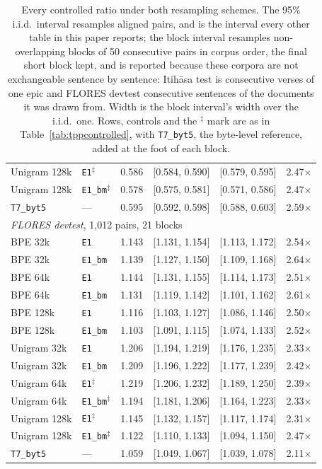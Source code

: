 \begin{table}[t]
\begin{tabular}{llrrrr}
Unigram 128k & \texttt{E1}$^{\ddagger}$ & 0.586 & [0.584, 0.590] & [0.579, 0.595] & 2.47$\times$ \\
Unigram 128k & \texttt{E1\_bm}$^{\ddagger}$ & 0.578 & [0.575, 0.581] & [0.571, 0.586] & 2.47$\times$ \\
\texttt{T7\_byt5} & --- & 0.595 & [0.592, 0.598] & [0.588, 0.603] & 2.59$\times$ \\
\midrule
\multicolumn{6}{l}{\emph{FLORES devtest}, 1,012 pairs, 21 blocks} \\
BPE 32k & \texttt{E1} & 1.143 & [1.131, 1.154] & [1.113, 1.172] & 2.54$\times$ \\
BPE 32k & \texttt{E1\_bm} & 1.139 & [1.127, 1.150] & [1.109, 1.168] & 2.64$\times$ \\
BPE 64k & \texttt{E1} & 1.144 & [1.131, 1.155] & [1.114, 1.173] & 2.51$\times$ \\
BPE 64k & \texttt{E1\_bm} & 1.131 & [1.119, 1.142] & [1.101, 1.162] & 2.61$\times$ \\
BPE 128k & \texttt{E1} & 1.116 & [1.103, 1.127] & [1.086, 1.146] & 2.50$\times$ \\
BPE 128k & \texttt{E1\_bm} & 1.103 & [1.091, 1.115] & [1.074, 1.133] & 2.52$\times$ \\
Unigram 32k & \texttt{E1} & 1.206 & [1.194, 1.219] & [1.176, 1.235] & 2.33$\times$ \\
Unigram 32k & \texttt{E1\_bm} & 1.209 & [1.196, 1.222] & [1.177, 1.239] & 2.42$\times$ \\
Unigram 64k & \texttt{E1}$^{\ddagger}$ & 1.219 & [1.206, 1.232] & [1.189, 1.250] & 2.39$\times$ \\
Unigram 64k & \texttt{E1\_bm}$^{\ddagger}$ & 1.194 & [1.181, 1.206] & [1.164, 1.223] & 2.33$\times$ \\
Unigram 128k & \texttt{E1}$^{\ddagger}$ & 1.145 & [1.132, 1.157] & [1.117, 1.174] & 2.31$\times$ \\
Unigram 128k & \texttt{E1\_bm}$^{\ddagger}$ & 1.122 & [1.110, 1.133] & [1.094, 1.150] & 2.47$\times$ \\
\texttt{T7\_byt5} & --- & 1.059 & [1.049, 1.067] & [1.039, 1.078] & 2.11$\times$ \\
\bottomrule
\end{tabular}
\caption{Every controlled ratio under both resampling schemes. The 95\% i.i.d.\ interval resamples aligned pairs, and is the interval every other table in this paper reports; the block interval resamples non-overlapping blocks of 50 consecutive pairs in corpus order, the final short block kept, and is reported because these corpora are not exchangeable sentence by sentence: Itih\=asa test is consecutive verses of one epic and FLORES devtest consecutive sentences of the documents it was drawn from. Width is the block interval's width over the i.i.d.\ one. Rows, controls and the $^{\ddagger}$ mark are as in Table~\ref{tab:tppcontrolled}, with \texttt{T7\_byt5}, the byte-level reference, added at the foot of each block.}
\label{tab:blockci}
\end{table}
